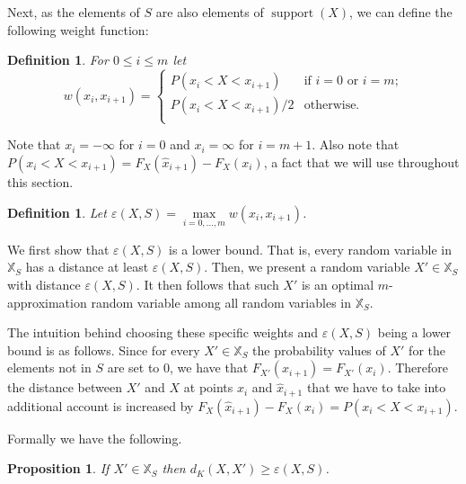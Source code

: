 \documentclass{article}
\newtheorem{definition}[thm]{Definition}
\newtheorem{proposition}[thm]{Proposition}
\DeclareMathOperator{\support}{support}
\begin{document}
Next, as the elements of $S$ are also elements of $\support(X)$, we can define the following weight function:

\begin{definition}\label{def:weight} For $0\leq i \leq m$ let
	\[
	w(x_i,x_{i+1})=
	\begin{cases}
	P(x_i < X < x_{i+1}) & \text{if $i=0$ or $i = m$;} \\
	P(x_i < X < x_{i+1})/2 & \text{otherwise.} \\	
	\end{cases}
	\]
\end{definition}

Note that $x_i = -\infty$ for $i=0$ and $x_i=\infty$ for $i=m+1$. Also note that $P(x_i < X < x_{i+1}) = F_X(\hat x_{i+1}) - F_X(x_i)$, a fact that we will use throughout this section.

\begin{definition}\label{def:error}
Let $\varepsilon(X,S) = \max\limits_{i=0,\dots,m} w(x_{i}, x_{i+1})$.
\end{definition}



We first show that $\varepsilon(X,S)$ is a lower bound. That is, every random variable in $\mathbb{X}_S$ has a distance at least $\varepsilon(X,S)$. Then, we present a random variable $X'\in \mathbb{X}_S$ with distance $\varepsilon(X,S)$. It then follows that such $X'$ is an optimal $m$-approximation random variable among all random variables in $\mathbb{X}_S$.

The intuition behind choosing these specific weights and $\varepsilon(X,S)$ being a lower bound is as follows.  Since for every $X'\in\mathbb{X}_S$ the probability values of $X'$ for the elements not in $S$ are set to $0$, we have that $F_{X'}(\hat x_{i+1})=F_{X'}(x_i)$. Therefore the distance between $X'$ and $X$ at points $x_i$ and $\hat x_{i+1}$ that we have to take into additional account is increased by $F_X(\hat x_{i+1})-F_X(x_i) = P(x_i < X < x_{i+1})$.

Formally we have the following.

\begin{proposition}\label{prop:minimal}
	If $X'\in\mathbb{X}_S$ then $d_K(X,X') \geq \varepsilon(X,S)$.
\end{proposition}
\end{document}

